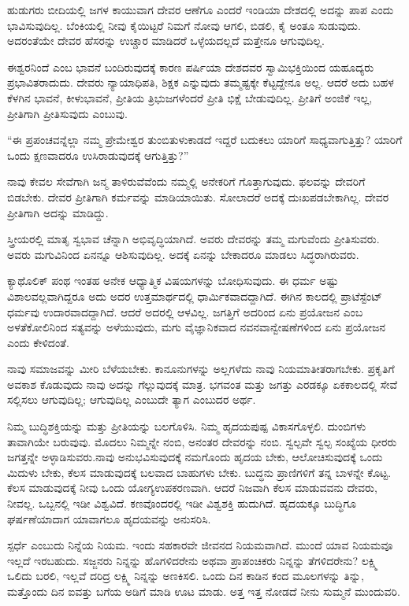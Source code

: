 ಹುಡುಗರು ಬೀದಿಯಲ್ಲಿ ಜಗಳ ಕಾಯುವಾಗ ದೇವರ ಆಣೆಗೂ ಎಂದರೆ ಇಂಡಿಯಾ ದೇಶದಲ್ಲಿ ಅದನ್ನು ಪಾಪ ಎಂದು ಭಾವಿಸುವುದಿಲ್ಲ. ಬೆಂಕಿಯಲ್ಲಿ ನೀವು ಕೈಯಿಟ್ಟರೆ ನಿಮಗೆ ನೋವು ಆಗಲಿ, ಬಿಡಲಿ, ಕೈ ಅಂತೂ ಸುಡುವುದು. ಅದರಂತೆಯೇ ದೇವರ ಹೆಸರನ್ನು ಉಚ್ಚಾರ ಮಾಡಿದರೆ ಒಳ್ಳೆಯದಲ್ಲದೆ ಮತ್ತೇನೂ ಆಗುವುದಿಲ್ಲ.

ಈಶ್ವರನಿಂದೆ  ಎಂಬ ಭಾವನೆ ಬಂದಿರುವುದಕ್ಕೆ ಕಾರಣ ಪರ್ಷಿಯಾ ದೇಶದವರ ಸ್ವಾಮಿಭಕ್ತಿಯಿಂದ ಯಹೂದ್ಯರು ಪ್ರಭಾವಿತರಾದುದು. ದೇವರು ನ್ಯಾಯಾಧಿಪತಿ, ಶಿಕ್ಷಕ ಎನ್ನುವುದು ತಮ್ಮಷ್ಟಕ್ಕೇ ಕೆಟ್ಟದ್ದೇನೂ ಅಲ್ಲ. ಆದರೆ ಅದು ಬಹಳ ಕೆಳಗಿನ ಭಾವನೆ, ಕೀಳುಭಾವನೆ, ಪ್ರೀತಿಯ ತ್ರಿಭುಜಗಳೆಂದರೆ ಪ್ರೀತಿ ಭಿಕ್ಷೆ ಬೇಡುವುದಿಲ್ಲ. ಪ್ರೀತಿಗೆ ಅಂಜಿಕೆ ಇಲ್ಲ, ಪ್ರೀತಿಗಾಗಿ ಪ್ರೀತಿಸುವುದು ಎಂಬುವು.

\eject

“ಈ ಪ್ರಪಂಚವನ್ನೆಲ್ಲಾ ನಮ್ಮ ಪ್ರೇಮೇಶ್ವರ ತುಂಬಿತುಳುಕಾಡದೆ ಇದ್ದರೆ ಬದುಕಲು ಯಾರಿಗೆ ಸಾಧ್ಯವಾಗುತ್ತಿತ್ತು? ಯಾರಿಗೆ ಒಂದು ಕ್ಷಣವಾದರೂ ಉಸಿರಾಡುವುದಕ್ಕೆ ಆಗುತ್ತಿತ್ತು?”

ನಾವು ಕೇವಲ ಸೇವೆಗಾಗಿ ಜನ್ಮ ತಾಳಿರುವೆವೆಂದು ನಮ್ಮಲ್ಲಿ ಅನೇಕರಿಗೆ ಗೊತ್ತಾಗುವುದು. ಫಲವನ್ನು ದೇವರಿಗೆ ಬಿಡಬೇಕು. ದೇವರ ಪ್ರೀತಿಗಾಗಿ ಕರ್ಮವನ್ನು ಮಾಡಿಯಾಯಿತು. ಸೋಲಾದರೆ ಅದಕ್ಕೆ ದುಃಖಪಡಬೇಕಾಗಿಲ್ಲ. ದೇವರ ಪ್ರೀತಿಗಾಗಿ ಅದನ್ನು ಮಾಡಿದ್ದು.

ಸ್ತ್ರೀಯರಲ್ಲಿ ಮಾತೃ ಸ್ವಭಾವ ಚೆನ್ನಾಗಿ ಅಭಿವೃದ್ಧಿಯಾಗಿದೆ. ಅವರು ದೇವರನ್ನು ತಮ್ಮ ಮಗುವೆಂದು ಪ್ರೀತಿಸುವರು. ಅವರು ಮಗುವಿನಿಂದ ಏನನ್ನೂ ಆಶಿಸುವುದಿಲ್ಲ. ಅದಕ್ಕೆ ಏನನ್ನು ಬೇಕಾದರೂ ಮಾಡಲು ಸಿದ್ಧರಾಗಿರುವರು.

ಕ್ಯಾಥೊಲಿಕ್​ ಪಂಥ ಇಂತಹ ಅನೇಕ ಆಧ್ಯಾತ್ಮಿಕ ವಿಷಯಗಳನ್ನು ಬೋಧಿಸುವುದು. ಈ ಧರ್ಮ ಅಷ್ಟು ವಿಶಾಲವಲ್ಲವಾಗಿದ್ದರೂ ಅದು ಅದರ ಉತ್ತಮಾರ್ಥದಲ್ಲಿ ಧಾರ್ಮಿಕವಾದ\-ದ್ದಾಗಿದೆ. ಈಗಿನ ಕಾಲದಲ್ಲಿ ಪ್ರಾಟೆಸ್ಟೆಂಟ್​ ಧರ್ಮವು ಉದಾರವಾದದ್ದಾಗಿದೆ. ಆದರೆ ಅದರಲ್ಲಿ ಆಳವಿಲ್ಲ. ಜಗತ್ತಿಗೆ ಅದರಿಂದ ಏನು ಪ್ರಯೋಜನ ಎಂಬ ಅಳತೆಕೋಲಿನಿಂದ ಸತ್ಯವನ್ನು ಅಳೆಯುವುದು, ಮಗು ವೈಜ್ಞಾನಿಕವಾದ ನವನವಾನ್ವೇಷಣೆಗಳಿಂದ ಏನು ಪ್ರಯೋಜನ ಎಂದು ಕೇಳಿದಂತೆ.

ನಾವು ಸಮಾಜವನ್ನು ಮೀರಿ ಬೆಳೆಯಬೇಕು. ಕಾನೂನುಗಳನ್ನು ಅಲ್ಲಗಳೆದು ನಾವು ನಿಯಮಾತೀತರಾಗಬೇಕು. ಪ್ರಕೃತಿಗೆ ಅವಕಾಶ ಕೊಡುವುದು ನಾವು ಅದನ್ನು ಗೆಲ್ಲುವುದಕ್ಕೆ ಮಾತ್ರ. ಭಗವಂತ ಮತ್ತು ಜಗತ್ತು ಎರಡಕ್ಕೂ ಏಕಕಾಲದಲ್ಲಿ ಸೇವೆ ಸಲ್ಲಿಸಲು ಆಗುವುದಿಲ್ಲ; ಆಗುವುದಿಲ್ಲ ಎಂಬುದೇ ತ್ಯಾಗ ಎಂಬುದರ ಅರ್ಥ.

ನಿಮ್ಮ ಬುದ್ಧಿಶಕ್ತಿಯನ್ನು ಮತ್ತು ಪ್ರೀತಿಯನ್ನು ಬಲಗೊಳಿಸಿ. ನಿಮ್ಮ ಹೃದಯಪುಷ್ಪ ವಿಕಾಸಗೊಳ್ಳಲಿ. ದುಂಬಿಗಳು ತಾವಾಗಿಯೇ ಬರುವುವು. ಮೊದಲು ನಿಮ್ಮನ್ನೇ ನಂಬಿ, ಅನಂತರ ದೇವರನ್ನು ನಂಬಿ. ಸ್ವಲ್ಪವೇ ಸ್ವಲ್ಪ ಸಂಖ್ಯೆಯ ಧೀರರು ಜಗತ್ತನ್ನೇ ಅಳ್ಳಾಡಿಸುವರು.\break ನಾವು ಅನುಭವಿಸುವುದಕ್ಕೆ ನಮಗೊಂದು ಹೃದಯ ಬೇಕು, ಆಲೋಚಿಸುವುದಕ್ಕೆ ಒಂದು ಮಿದುಳು ಬೇಕು, ಕೆಲಸ ಮಾಡುವುದಕ್ಕೆ ಬಲವಾದ ಬಾಹುಗಳು ಬೇಕು. ಬುದ್ಧನು ಪ್ರಾಣಿಗಳಿಗೆ ತನ್ನ ಬಾಳನ್ನೇ ಕೊಟ್ಟ. ಕೆಲಸ ಮಾಡುವುದಕ್ಕೆ ನೀವು ಒಂದು ಯೋಗ್ಯ\break ಉಪಕರಣವಾಗಿ. ಆದರೆ ನಿಜವಾಗಿ ಕೆಲಸ ಮಾಡುವವನು ದೇವರು, ನೀವಲ್ಲ. ಒಬ್ಬನಲ್ಲಿ ಇಡೀ ವಿಶ್ವವಿದೆ. ಕಣವೊಂದರಲ್ಲಿ ಇಡೀ ವಿಶ್ವಶಕ್ತಿ ಹುದುಗಿದೆ. ಹೃದಯಕ್ಕೂ ಬುದ್ಧಿಗೂ ಘರ್ಷಣೆಯಾದಾಗ ಯಾವಾಗಲೂ ಹೃದಯವನ್ನು ಅನುಸರಿಸಿ.

ಸ್ಪರ್ಧೆ ಎಂಬುದು ನಿನ್ನೆಯ ನಿಯಮ. ಇಂದು ಸಹಕಾರವೇ ಜೀವನದ ನಿಯಮ\-ವಾಗಿದೆ. ಮುಂದೆ ಯಾವ ನಿಯಮವೂ ಇಲ್ಲದೆ ಇರಬಹುದು. ಸಜ್ಜನರು ನಿನ್ನನ್ನು ಹೊಗಳಿದರೇನು ಅಥವಾ ಪ್ರಾಪಂಚಿಕರು ನಿನ್ನನ್ನು ತೆಗಳಿದರೇನು? ಲಕ್ಷ್ಮಿ ಒಲಿದು ಬರಲಿ, ಇಲ್ಲವೆ ದರಿದ್ರ ಲಕ್ಷ್ಮಿ ನಿನ್ನನ್ನು ಅಣಕಿಸಲಿ. ಒಂದು ದಿನ ಕಾಡಿನ ಕಂದ ಮೂಲಗಳನ್ನು ತಿನ್ನು, ಮತ್ತೊಂದು ದಿನ ಐವತ್ತು ಬಗೆಯ ಅಡಿಗೆ ಮಾಡಿ ಊಟ ಮಾಡು. ಅತ್ತ ಇತ್ತ ನೋಡದೆ ನೀನು ಸುಮ್ಮನೆ ಮುಂದುವರಿ.

